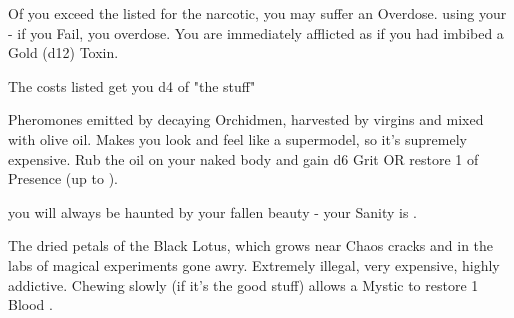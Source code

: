 {\begin{multicols}{2}

  Of you exceed the \MAX listed for the narcotic, you may suffer an Overdose.  \RS using your \VIG - if you Fail, you overdose.  You are immediately afflicted as if you had imbibed a Gold (d12) Toxin\footnotemark[\value{footnote}].

  \cbreak



  The costs listed get you d4 \UD of "the stuff"



  Pheromones emitted by decaying Orchidmen, harvested by virgins and mixed with olive oil.  Makes you look and feel like a supermodel, so it's supremely expensive.  Rub the oil on your naked body and gain d6 Grit OR restore 1 \UD of Presence (up to \MAX).

    you will always be haunted by your fallen beauty - your \MAX Sanity is \DCDOWN.


  The dried petals of the Black Lotus, which grows near Chaos cracks and in the labs of magical experiments gone awry. Extremely illegal, very expensive, highly addictive.  Chewing slowly (if it's the good stuff) allows a Mystic to restore 1 Blood \POOL.


\end{multicols}}
